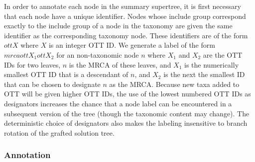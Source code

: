 \documentclass[fleqn,12pt,lineno,english]{wlpeerj}
\begin{document}
In order to annotate each node in the summary supertree, it is first
necessary that each node have a unique identifier. Nodes whose include
group correspond exactly to the include group of a node in the taxonomy
are given the same identifier as the corresponding taxonomy node.
These identifiers are of the form $ottX$ where $X$ is an integer
OTT ID. We generate a label of the form $mrcaottX_{1}ottX_{2}$ for
an non-taxonomic node $n$ where $X_{1}$ and $X_{2}$ are the OTT
IDs for two leaves, $n$ is the MRCA of these leaves, and $X_{1}$
is the numerically smallest OTT ID that is a descendant of $n$, and
$X_{2}$ is the next the smallest ID that can be chosen to designate
$n$ as the MRCA. Because new taxa added to OTT will be given higher
OTT IDs, the use of the lowest numbered OTT IDs as designators increases
the chance that a node label can be encountered in a subsequent version
of the tree (though the taxonomic content may change). The deterministic
choice of designators also makes the labeling insensitive to branch
rotation of the grafted solution tree.

\subsubsection{Annotation}\label{sec:Annotation}
\end{document}

